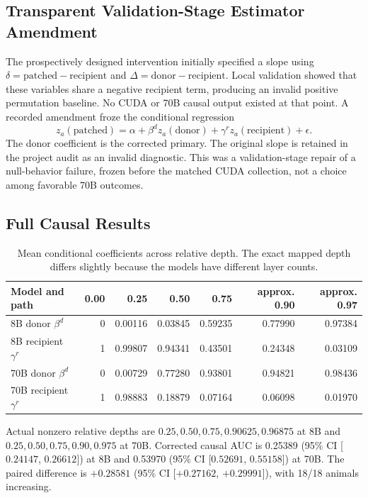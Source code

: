 \documentclass[letterpaper]{article}
\newcommand{\CI}[2]{95\% CI [#1, #2]}
\begin{document}
\subsection{Transparent Validation-Stage Estimator Amendment}

The prospectively designed intervention initially specified a slope using
$\delta=\mathrm{patched}-\mathrm{recipient}$ and
$\Delta=\mathrm{donor}-\mathrm{recipient}$. Local validation showed that these
variables share a negative recipient term, producing an invalid positive
permutation baseline. No CUDA or 70B causal output existed at that point. A
recorded amendment froze the conditional regression
\begin{equation}
z_a(\mathrm{patched})=\alpha+\beta^d z_a(\mathrm{donor})
+\gamma^r z_a(\mathrm{recipient})+\epsilon.
\end{equation}
The donor coefficient is the corrected primary. The original slope is retained
in the project audit as an invalid diagnostic. This was a validation-stage
repair of a null-behavior failure, frozen before the matched CUDA collection,
not a choice among favorable 70B outcomes.

\subsection{Full Causal Results}

\begin{table}[t]
\centering
\caption{Mean conditional coefficients across relative depth. The exact mapped
depth differs slightly because the models have different layer counts.}
\label{tab:causal}
\begin{tabular}{lrrrrrr}
\toprule
Model and path & 0.00 & 0.25 & 0.50 & 0.75 & approx. 0.90 & approx. 0.97 \\
\midrule
8B donor $\beta^d$ & 0 & 0.00116 & 0.03845 & 0.59235 & 0.77990 & 0.97384 \\
8B recipient $\gamma^r$ & 1 & 0.99807 & 0.94341 & 0.43501 & 0.24348 & 0.03109 \\
70B donor $\beta^d$ & 0 & 0.00729 & 0.77280 & 0.93801 & 0.94821 & 0.98436 \\
70B recipient $\gamma^r$ & 1 & 0.98883 & 0.18879 & 0.07164 & 0.06098 & 0.01970 \\
\bottomrule
\end{tabular}
\end{table}

Actual nonzero relative depths are
$0.25,0.50,0.75,0.90625,0.96875$ at 8B and
$0.25,0.50,0.75,0.90,0.975$ at 70B. Corrected causal AUC is 0.25389
(\CI{$0.24147$}{$0.26612$}) at 8B and 0.53970
(\CI{$0.52691$}{$0.55158$}) at 70B. The paired difference is $+0.28581$
(\CI{$+0.27162$}{$+0.29991$}), with 18/18 animals increasing.
\end{document}
